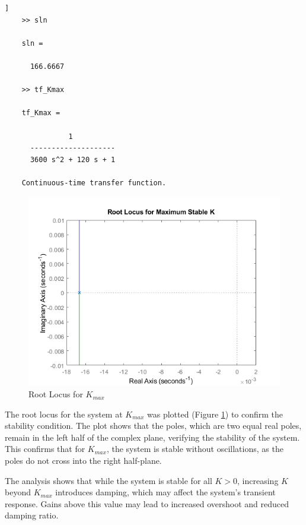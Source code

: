 \documentclass[a4paper, 12pt, english]{article}
\begin{document}
\begin{lstlisting}[style=commandstyle,caption=Command line output]]
    >> sln

    sln =

      166.6667

    >> tf_Kmax

    tf_Kmax =
     
               1
      --------------------
      3600 s^2 + 120 s + 1
     
    Continuous-time transfer function.

\end{lstlisting}

\begin{figure}[H]
    \centering
    \includegraphics[width=0.8\linewidth]{report/images/RootLocusKmax.png}
    \caption{Root Locus for $ {K}_{max} $}
    \label{fig:Root Locus for Kmax}
\end{figure}

The root locus for the system at $ {K}_{max} $ was plotted (Figure \ref{fig:Root Locus for Kmax}) to confirm the stability condition. The plot shows that the poles, which are two equal real poles, remain in the left half of the complex plane, verifying the stability of the system. This confirms that for $ {K}_{max} $, the system is stable without oscillations, as the poles do not cross into the right half-plane.

\noindent
The analysis shows that while the system is stable for all $ K > 0 $, increasing $K$ beyond $ {K}_{max} $ introduces damping, which may affect the system's transient response. Gains above this value may lead to increased overshoot and reduced damping ratio.

\end{document}
